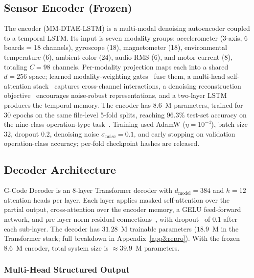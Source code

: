 \documentclass[sensors,article,submit,moreauthors,pdftex]{Definitions/mdpi}
\newcommand{\modelname}{G-Code Decoder}
\newcommand{\encname}{MM-DTAE-LSTM}
\begin{document}
\subsection{Sensor Encoder (Frozen)}
\label{sec:encoder}

The encoder (\encname{}) is a multi-modal denoising autoencoder coupled to a temporal LSTM. Its input is seven modality groups: accelerometer (3-axis, 6 boards = 18 channels), gyroscope (18), magnetometer (18), environmental temperature (6), ambient color (24), audio RMS (6), and motor current (8), totaling $C=98$ channels. Per-modality projection maps each into a shared $d=256$ space; learned modality-weighting gates~\cite{lahat2015multimodal,ramachandram2017deep} fuse them, a multi-head self-attention stack~\cite{vaswani2017attention} captures cross-channel interactions, a denoising reconstruction objective~\cite{vincent2010stacked} encourages noise-robust representations, and a two-layer LSTM~\cite{hochreiter1997long,malhotra2015lstm} produces the temporal memory. The encoder has 8.6~M parameters, trained for 30 epochs on the same file-level 5-fold splits, reaching 96.3\% test-set accuracy on the nine-class operation-type task~\cite{encoder_paper}. Training used AdamW ($\eta\!=\!10^{-4}$), batch size 32, dropout 0.2, denoising noise $\sigma_{\text{noise}}\!=\!0.1$, and early stopping on validation operation-class accuracy; per-fold checkpoint hashes are released.


\subsection{Decoder Architecture}
\label{sec:decoder}

\modelname{} is an 8-layer Transformer decoder with $d_{\text{model}}=384$ and $h=12$ attention heads per layer. Each layer applies masked self-attention over the partial output, cross-attention over the encoder memory, a GELU feed-forward network, and pre-layer-norm residual connections~\cite{ba2016layernorm}, with dropout~\cite{srivastava2014dropout} of $0.1$ after each sub-layer. The decoder has $31.28$~M trainable parameters ($18.9$~M in the Transformer stack; full breakdown in Appendix~\ref{app3:repro}). With the frozen $8.6$~M encoder, total system size is $\approx\!39.9$~M parameters.

\subsubsection{Multi-Head Structured Output}
\label{sec:multihead}
\end{document}
